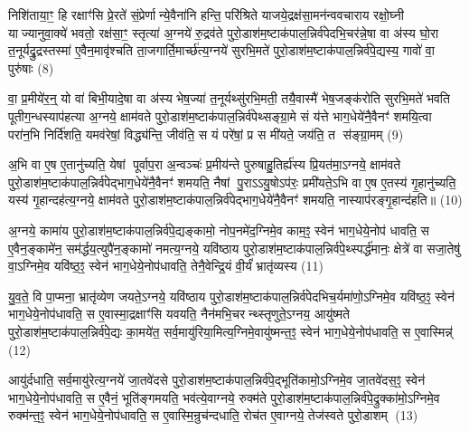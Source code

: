 निशि॑ताया॒ꣳ॒ हि रक्षाꣳ॑सि प्रे॒रते॑ सं॒प्रेर्णान्ये॒वैना॑नि हन्ति॒ परि॑श्रिते याजये॒द्रक्ष॑सा॒मन॑न्ववचाराय रक्षो॒घ्नी याज्यानुवा॒क्ये॑ भवतो॒ रक्ष॑सा॒ꣳ॒ स्तृत्या॑ अ॒ग्नये॑ रु॒द्रव॑ते पुरो॒डाश॑म॒ष्टाक॑पाल॒न्निर्व॑पेदभि॒चर॑न्ने॒षा वा अ॑स्य घो॒रा त॒नूर्यद्रु॒द्रस्तस्मा॑ ए॒वैन॒मावृ॑श्चति ता॒जगार्ति॒मार्च्छ॑त्य॒ग्नये॑ सुरभि॒मते॑ पुरो॒डाश॑म॒ष्टाक॑पाल॒न्निर्व॑पे॒द्यस्य॒ गावो॑ वा॒ पुरु॑षाः (8)

वा॒ प्र॒मीये॑र॒न्॒ यो वा॑ बिभी॒यादे॒षा वा अ॑स्य भेष॒ज्या॑ त॒नूर्यथ्सु॑रभि॒मती॒ तयै॒वास्मै॑ भेष॒जङ्क॑रोति सुरभि॒मते॑ भवति पूतीग॒न्धस्याप॑हत्या अ॒ग्नये॒ क्षाम॑वते पुरो॒डाश॑म॒ष्टाक॑पाल॒न्निर्व॑पेथ्सङ्ग्रा॒मे सं य॑त्ते भाग॒धेये॑नै॒वैनꣳ॑ शमयि॒त्वा परा॑न॒भि निर्दि॑शति॒ यमव॑रेषां॒ विद्ध्य॑न्ति॒ जीव॑ति॒ स यं परे॑षां॒ प्र स मी॑यते॒ जय॑ति॒ त स॑ङ्ग्रा॒मम् (9)

अ॒भि वा ए॒ष ए॒तानु॑च्यति॒ येषां पूर्वाप॒रा अ॒न्वञ्चः॑ प्र॒मीय॑न्ते पुरुषाहु॒तिर्ह्य॑स्य प्रि॒यत॑मा॒ऽग्नये॒ क्षाम॑वते पुरो॒डाश॑म॒ष्टाक॑पाल॒न्निर्व॑पेद्भाग॒धेये॑नै॒वैनꣳ॑ शमयति॒ नैषां पु॒राऽऽयु॒षोऽप॑रः॒ प्रमी॑यते॒ऽभि वा ए॒ष ए॒तस्य॑ गृ॒हानु॑च्यति॒ यस्य॑ गृ॒हान्दह॑त्य॒ग्नये॒ क्षाम॑वते पुरो॒डाश॑म॒ष्टाक॑पाल॒न्निर्व॑पेद्भाग॒धेये॑नै॒वैनꣳ॑ शमयति॒ नास्याप॑रङ्गृ॒हान्द॑हति॥ (10)

{\anuvakamend[{व्र॒तप॑तये॒ निशि॑ताया॒न्निर्व॑पे॒त्पुरु॑षास्सङ्ग्रा॒मन्न च॒त्वारि॑ च॥२॥}]}

अ॒ग्नये॒ कामा॑य पुरो॒डाश॑म॒ष्टाक॑पाल॒न्निर्व॑पे॒द्यङ्कामो॒ नोप॒नमे॑द॒ग्निमे॒व काम॒ꣵ॒ स्वेन॑ भाग॒धेये॒नोप॑ धावति॒ स ए॒वैन॒ङ्कामे॑न॒ सम॑र्द्धय॒त्युपै॑न॒ङ्कामो॑ नमत्य॒ग्नये॒ यवि॑ष्ठाय पुरो॒डाश॑म॒ष्टाक॑पाल॒न्निर्व॑पे॒थ्स्पर्द्ध॑मानः॒ क्षेत्रे॑ वा सजा॒तेषु॑ वा॒ऽग्निमे॒व यवि॑ष्ठ॒ꣵ॒ स्वेन॑ भाग॒धेये॒नोप॑धावति॒ तेनै॒वेन्द्रि॒यं वी॒र्यं॑ भ्रातृ॑व्यस्य (11)

यु॒व॒ते॒ वि पा॒प्मना॒ भ्रातृ॑व्येण जयते॒ऽग्नये॒ यवि॑ष्ठाय पुरो॒डाश॑म॒ष्टाक॑पाल॒न्निर्व॑पेदभिच॒र्यमा॑णो॒ऽग्निमे॒व यवि॑ष्ठ॒ꣵ॒ स्वेन॑ भाग॒धेये॒नोप॑धावति॒ स ए॒वास्मा॒द्रक्षाꣳ॑सि यवयति॒ नैन॑मभि॒चरन्थ्स्तृणुते॒ऽग्नय॒ आयु॑ष्मते पुरो॒डाश॑म॒ष्टाक॑पाल॒न्निर्व॑पे॒द्यः का॒मये॑त॒ सर्व॒मायु॑रिया॒मित्य॒ग्निमे॒वायु॑ष्मन्त॒ꣵ॒ स्वेन॑ भाग॒धेये॒नोप॑धावति॒ स ए॒वास्मिन्न्॑ (12)

आयु॑र्दधाति॒ सर्व॒मायु॑रेत्य॒ग्नये॑ जा॒तवे॑दसे पुरो॒डाश॑म॒ष्टाक॑पाल॒न्निर्व॑पे॒द्भूति॑कामो॒ऽग्निमे॒व जा॒तवे॑दस॒ꣵ॒ स्वेन॑ भाग॒धेये॒नोप॑धावति॒ स ए॒वैनं॒ भूति॑ङ्गमयति॒ भव॑त्ये॒वाग्नये॒ रुक्म॑ते पुरो॒डाश॑म॒ष्टाक॑पाल॒न्निर्व॑पे॒द्रुक्का॑मो॒ऽग्निमे॒व रुक्म॑न्त॒ꣵ॒ स्वेन॑ भाग॒धेये॒नोप॑धावति॒ स ए॒वास्मि॒न्रुच॑न्दधाति॒ रोच॑त ए॒वाग्नये॒ तेज॑स्वते पुरो॒डाशम् (13)

